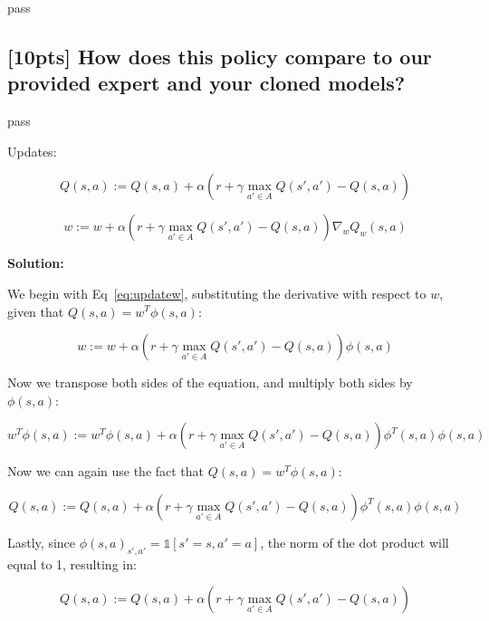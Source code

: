 \documentclass{article}
\begin{document}
pass

\subsection{[10pts] How does this policy compare to our provided expert and your cloned models?}

pass





Updates:

\begin{equation} \label{eq:updateQ}
  Q(s,a) := Q(s,a) + \alpha \left(r+\gamma \max_{a' \in A} Q(s',a') - Q(s,a)\right) 
\end{equation}

\begin{equation} \label{eq:updatew}
  w := w + \alpha \left(r+\gamma \max_{a' \in A} Q(s',a') - Q(s,a)\right) \nabla_w  Q_w(s,a)
\end{equation}

\textbf{Solution:}

We begin with Eq~\ref{eq:updatew}, substituting the derivative with respect to $w$, given that $Q(s,a)=w^T\phi(s,a)$:

\begin{equation} \label{eq:derivation_1}
  w := w + \alpha \left(r+\gamma \max_{a' \in A} Q(s',a') - Q(s,a)\right) \phi(s,a)
\end{equation}

Now we transpose both sides of the equation, and multiply both sides by $\phi(s,a)$:

\begin{equation} \label{eq:derivation_2}
  w^T\phi(s,a) := w^T\phi(s,a) + \alpha \left(r+\gamma \max_{a' \in A} Q(s',a') - Q(s,a)\right) \phi^T(s,a) \phi(s,a)
\end{equation}

Now we can again use the fact that $Q(s,a)=w^T\phi(s,a)$:

\begin{equation} \label{eq:derivation_3}
  Q(s,a) := Q(s,a) + \alpha \left(r+\gamma \max_{a' \in A} Q(s',a') - Q(s,a)\right) \phi^T(s,a) \phi(s,a)
\end{equation}

Lastly, since $\phi(s,a)_{s',a'} = \mathbb{1}[s'=s, a'=a]$, the norm of the dot product will equal to 1, resulting in:

\begin{equation} \label{eq:derivation_4}
  Q(s,a) := Q(s,a) + \alpha \left(r+\gamma \max_{a' \in A} Q(s',a') - Q(s,a)\right)
\end{equation}
\end{document}
